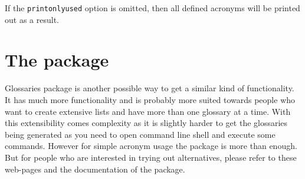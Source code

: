 \documentclass[
    draft
]{scrartcl}
\begin{document}
%
If the \verb|printonlyused| option is omitted, then all defined acronyms will be
    printed out as a result.

\section{The  package}

%
Glossaries package is another possible way to get a similar kind of
    functionality.
%
It has much more functionality and is probably more suited towards people who
    want to create extensive lists and have more than one glossary at a time.
%
With this extensibility comes complexity as it is slightly harder to get the
    glossaries being generated as you need to open command line shell and
    execute some commands.
%
However for simple acronym usage the  package is more than enough.
%
But for people who are interested in trying out alternatives, please refer
    to these web-pages and the documentation of the package.
\end{document}
